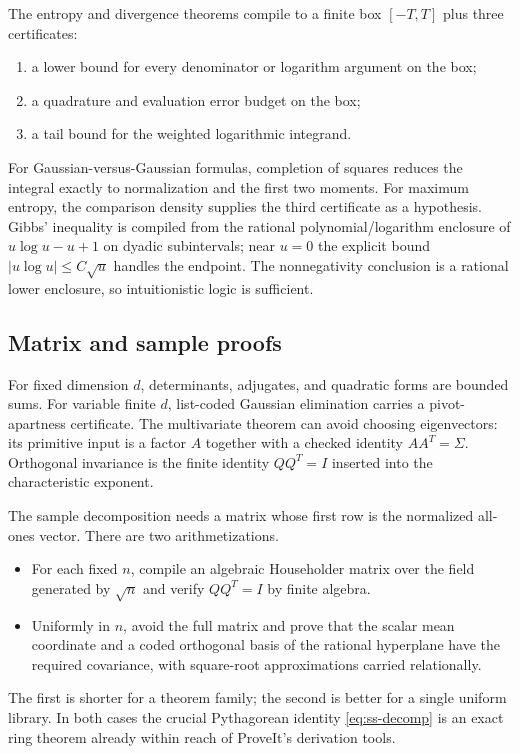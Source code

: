 The entropy and divergence theorems compile to a finite box $[-T,T]$ plus three certificates:
\begin{enumerate}[label=(\roman*)]
  \item a lower bound for every denominator or logarithm argument on the box;
  \item a quadrature and evaluation error budget on the box;
  \item a tail bound for the weighted logarithmic integrand.
\end{enumerate}
For Gaussian-versus-Gaussian formulas, completion of squares reduces the integral exactly to normalization and the first two moments.  For maximum entropy, the comparison density supplies the third certificate as a hypothesis.  Gibbs' inequality is compiled from the rational polynomial/logarithm enclosure of
$u\log u-u+1$ on dyadic subintervals; near $u=0$ the explicit bound $|u\log u|\le C\sqrt u$ handles the endpoint.  The nonnegativity conclusion is a rational lower enclosure, so intuitionistic logic is sufficient.

\subsection{Matrix and sample proofs}

For fixed dimension $d$, determinants, adjugates, and quadratic forms are bounded sums.  For variable finite $d$, list-coded Gaussian elimination carries a pivot-apartness certificate.  The multivariate theorem can avoid choosing eigenvectors: its primitive input is a factor $A$ together with a checked identity $AA^T=\Sigma$.  Orthogonal invariance is the finite identity $QQ^T=I$ inserted into the characteristic exponent.

The sample decomposition needs a matrix whose first row is the normalized all-ones vector.  There are two arithmetizations.
\begin{itemize}
  \item For each fixed $n$, compile an algebraic Householder matrix over the field generated by $\sqrt n$ and verify $QQ^T=I$ by finite algebra.
  \item Uniformly in $n$, avoid the full matrix and prove that the scalar mean coordinate and a coded orthogonal basis of the rational hyperplane have the required covariance, with square-root approximations carried relationally.
\end{itemize}
The first is shorter for a theorem family; the second is better for a single uniform library.  In both cases the crucial Pythagorean identity \eqref{eq:ss-decomp} is an exact ring theorem already within reach of ProveIt's derivation tools.

